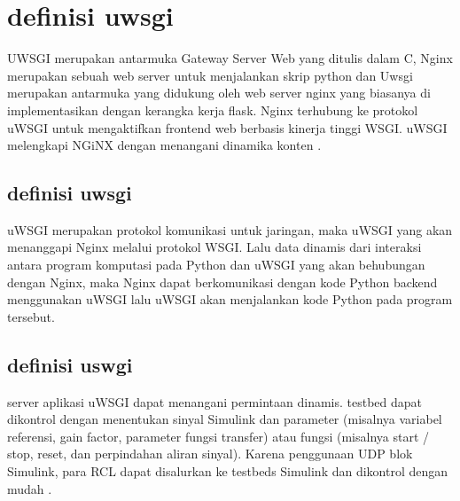 
\section{definisi uwsgi}
UWSGI merupakan antarmuka Gateway Server Web yang ditulis dalam C, Nginx merupakan sebuah web server untuk
menjalankan skrip python dan Uwsgi merupakan antarmuka yang didukung oleh web server nginx yang biasanya di implementasikan dengan kerangka kerja flask. Nginx terhubung ke protokol uWSGI untuk mengaktifkan frontend web berbasis kinerja tinggi WSGI. uWSGI melengkapi NGiNX dengan menangani dinamika konten \cite{balaji2013sentinel}.

\subsection{definisi uwsgi}
uWSGI merupakan protokol komunikasi untuk jaringan, maka uWSGI yang akan menanggapi Nginx melalui protokol WSGI. Lalu data dinamis dari interaksi antara program komputasi pada Python dan uWSGI yang akan behubungan dengan Nginx, maka Nginx dapat berkomunikasi dengan kode Python backend menggunakan uWSGI lalu uWSGI akan menjalankan kode Python pada program tersebut\cite{hirschbergreal}.

\subsection{definisi uswgi}
server aplikasi uWSGI dapat menangani permintaan dinamis. testbed dapat dikontrol dengan menentukan sinyal Simulink dan parameter (misalnya variabel referensi, gain factor, parameter fungsi transfer) atau fungsi (misalnya start / stop, reset, dan perpindahan aliran sinyal). Karena penggunaan UDP blok Simulink, para RCL dapat disalurkan ke testbeds Simulink dan dikontrol dengan mudah \cite{zumsandedesign}.

